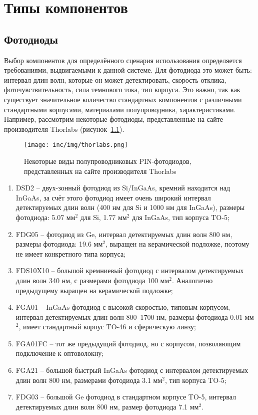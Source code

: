 \chapter{Типы компонентов}

\section{Фотодиоды}

Выбор компонентов для определённого сценария использования определяется требованиями, выдвигаемыми к данной системе. Для фотодиода это может быть: интервал длин волн, которые он может детектировать, скорость отклика, фоточувствительность, сила темнового тока, тип корпуса. Это важно, так как существует значительное количество стандартных компонентов с различными стандартными корпусами, материалами полупроводника, характеристиками. Например, рассмотрим некоторые фотодиоды, представленные на сайте производителя Thorlabs (рисунок~\ref{fig:thorlabs}).

\begin{figure}[!h]
    \centering
    \texttt{[image: inc/img/thorlabs.png]}
    \caption{Некоторые виды полупроводниковых PIN-фотодиодов, представленных на сайте производителя Thorlabs}
    \label{fig:thorlabs}
\end{figure}

\begin{enumerate}
    \item DSD2 \--- двух-зонный фотодиод из Si/InGaAs, кремний находится над InGaAs, за счёт этого фотодиод имеет очень широкий интервал детектируемых длин волн (400 нм для Si и 1000 нм для InGaAs), размеры фотодиода: 5.07 мм${}^2$ для Si, 1.77 мм${}^2$ для InGaAs, тип корпуса TO-5;
    \item FDG05 \--- фотодиод из Ge, интервал детектируемых длин волн 800 нм, размеры фотодиода: 19.6 мм${}^2$, выращен на керамической подложке, поэтому не имеет конкретного типа корпуса;
    \item FDS10X10 \--- большой кремниевый фотодиод с интервалом детектируемых длин волн 340 нм, с размерами фотодиода 100 мм${}^2$. Аналогично предыдущему выращен на керамической подложке;
    \item FGA01 \--- InGaAs фотодиод с высокой скоростью, типовым корпусом, интервал детектируемых длин волн 800\---1700 нм, размеры фотодиода 0.01 мм${}^2$, имеет стандартный корпус TO-46 и сферическую линзу;
    \item FGA01FC \--- тот же предыдущий фотодиод, но с корпусом, позволяющим подключение к оптоволокну;
    \item FGA21 \--- большой быстрый InGaAs фотодиод с интервалом детектируемых длин волн 800 нм, размерами фотодиода 3.1 мм${}^2$, тип корпуса TO-5;
    \item FDG03 \--- большой Ge фотодиод в стандартном корпусе TO-5, интервал детектируемых длин волн 800 нм, размер фотодиода 7.1 мм${}^2$.
\end{enumerate}

